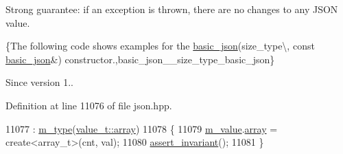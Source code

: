 Strong guarantee\+: if an exception is thrown, there are no changes to any J\+S\+ON value.

\{The following code shows examples for the \hyperlink{classnlohmann_1_1basic__json}{basic\+\_\+json}(size\+\_\+type\textbackslash{}, const \hyperlink{classnlohmann_1_1basic__json}{basic\+\_\+json}\&) constructor.,basic\+\_\+json\+\_\+\+\_\+size\+\_\+type\+\_\+basic\+\_\+json\}

\begin{DoxySince}{Since}
version 1.. 
\end{DoxySince}


Definition at line 11076 of file json.\+hpp.


\begin{DoxyCode}
11077         : \hyperlink{classnlohmann_1_1basic__json_a91990b60d7d4d67968a2c1db677536e7}{m\_type}(\hyperlink{namespacenlohmann_1_1detail_a1ed8fc6239da25abcaf681d30ace4985af1f713c9e000f5d3f280adbd124df4f5}{value\_t::array})
11078     \{
11079         \hyperlink{classnlohmann_1_1basic__json_aeb0814f76966f99290cb29e127c90a77}{m\_value}.\hyperlink{unionnlohmann_1_1basic__json_1_1json__value_a7947687f3ae1911d6e9847e2b3226157}{array} = create<array\_t>(cnt, val);
11080         \hyperlink{classnlohmann_1_1basic__json_a4a82d3fb7a111641decf35c2fb707c7f}{assert\_invariant}();
11081     \}
\end{DoxyCode}
\mbox{\label{classnlohmann_1_1basic__json_abe197e9f3184487805cfb5bba6fd5938}} 
